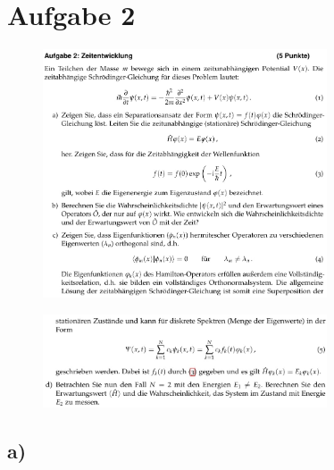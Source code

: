 \section{Aufgabe 2}

\begin{figure}[H]
    \centering
    \includegraphics[width=0.75\textwidth]{./images/Aufgabe2abc.jpg}
    \label{fig:2}
\end{figure}

\begin{figure}[H]
    \centering
    \includegraphics[width=0.75\textwidth]{./images/Aufgabe2d.jpg}
    \label{fig:3}
\end{figure}

\subsection{a)}

